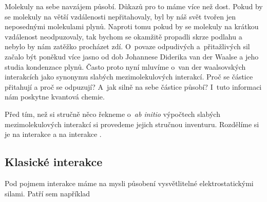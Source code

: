 Molekuly na sebe navzájem působí. Důkazů pro to máme více než dost. Pokud by se molekuly na větší vzdálenosti nepřitahovaly, byl by náš svět tvořen jen neposednými molekulami plynů. Naproti tomu pokud by se molekuly na krátkou vzdálenost neodpuzovaly, tak bychom se okamžitě propadli skrze podlahu a nebylo by nám zatěžko procházet zdí. O~povaze odpudivých a~přitažlivých sil začalo být poněkud více jasno od dob Johannese Diderika van der Waalse a jeho studia kondenzace plynů. Často proto nyní mluvíme o~van der waalsovských interakcích jako synonymu slabých mezimolekulových interakcí. Proč se částice přitahují a proč se odpuzují? A~jak silně na sebe částice působí? I~tuto informaci nám poskytne kvantová chemie.

Před tím, než si stručně něco řekneme o~\textit{ab initio} výpočtech slabých mezimolekulových interakcí si provedeme jejich stručnou inventuru. Rozdělíme si je na  interakce a na interakce .


\subsection{Klasické interakce}
Pod pojmem  interakce máme na mysli působení vysvětlitelné elektrostatickými silami. Patří sem například


